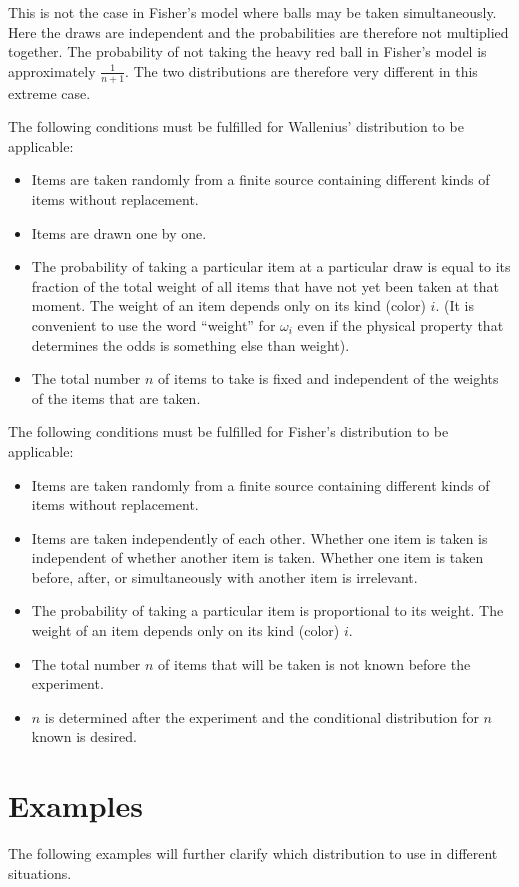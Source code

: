 \documentclass[a4paper]{article}
\begin{document}
This is not the case in Fisher's model where balls may be taken 
simultaneously. Here the draws are independent
and the probabilities are therefore not multiplied together. The 
probability of not taking the heavy red ball in Fisher's model is approximately
$\frac{1}{n+1}$. The two distributions are therefore very different
in this extreme case.
\vskip 5mm

The following conditions must be fulfilled for Wallenius' distribution
to be applicable:
%
\begin{itemize}
%
\item Items are taken randomly from a finite source containing different
kinds of items without replacement.
%
\item Items are drawn one by one.
%
\item The probability of taking a particular item at a particular draw is equal
to its fraction of the total weight of all items that have not yet been taken at that
moment. The weight of an item depends only on its kind (color) $i$.
(It is convenient to use the word ``weight'' for $\omega_i$ even if the
physical property that determines the odds is something else than weight).
%
\item The total number $n$ of items to take is fixed and independent of
the weights of the items that are taken.
%
\end{itemize}
\vskip 5mm

The following conditions must be fulfilled for Fisher's distribution
to be applicable:
%
\begin{itemize}
%
\item Items are taken randomly from a finite source containing different
kinds of items without replacement.
%
\item Items are taken independently of each other. Whether one item is taken
is independent of whether another item is taken. Whether one item is taken
before, after, or simultaneously with another item is irrelevant.
%
\item The probability of taking a particular item is proportional to its weight.
The weight of an item depends only on its kind (color) $i$.
%
\item The total number $n$ of items that will be taken is not known 
before the experiment.
%
\item $n$ is determined after the experiment and the conditional distribution
for $n$ known is desired.
%
\end{itemize}


\section{Examples}
%
The following examples will further clarify which distribution to use in different
situations.
\end{document}
